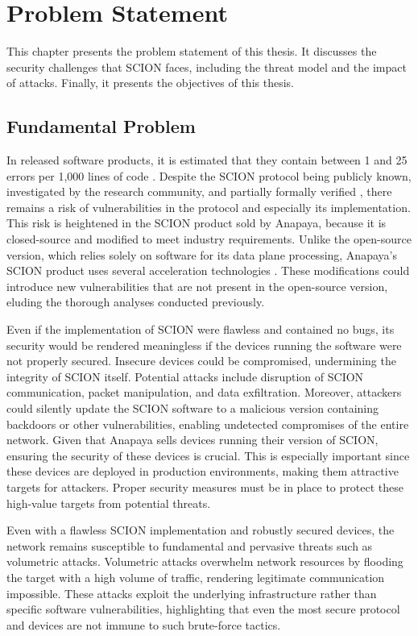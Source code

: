 \chapter{Problem Statement}
\label{ch:problem}

This chapter presents the problem statement of this thesis.
It discusses the security challenges that SCION faces, including the threat model and the impact of attacks.
Finally, it presents the objectives of this thesis.

\section{Fundamental Problem}
\label{sec:fundamental-problem}
In released software products, it is estimated that they contain between 1 and 25 errors per 1,000 lines of code \cite{McConnell2004}.
Despite the SCION protocol being publicly known, investigated by the research community, and partially formally verified \cite[Chapters 7, 22, and 23]{Perrig2022}, there remains a risk of vulnerabilities in the protocol and especially its implementation.
This risk is heightened in the SCION product sold by Anapaya, because it is closed-source and modified to meet industry requirements.
Unlike the open-source version, which relies solely on software for its data plane processing, Anapaya's SCION product uses several acceleration technologies \cite{anapayaPerformanceOptimizations}.
These modifications could introduce new vulnerabilities that are not present in the open-source version, eluding the thorough analyses conducted previously.

Even if the implementation of SCION were flawless and contained no bugs, its security would be rendered meaningless if the devices running the software were not properly secured.
Insecure devices could be compromised, undermining the integrity of SCION itself.
Potential attacks include disruption of SCION communication, packet manipulation, and data exfiltration.
Moreover, attackers could silently update the SCION software to a malicious version containing backdoors or other vulnerabilities, enabling undetected compromises of the entire network.
Given that Anapaya sells devices running their version of SCION, ensuring the security of these devices is crucial.
This is especially important since these devices are deployed in production environments, making them attractive targets for attackers.
Proper security measures must be in place to protect these high-value targets from potential threats.

Even with a flawless SCION implementation and robustly secured devices, the network remains susceptible to fundamental and pervasive threats such as volumetric attacks.
Volumetric attacks overwhelm network resources by flooding the target with a high volume of traffic, rendering legitimate communication impossible.
These attacks exploit the underlying infrastructure rather than specific software vulnerabilities, highlighting that even the most secure protocol and devices are not immune to such brute-force tactics.

